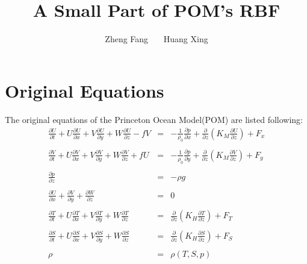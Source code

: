 \documentclass[oribibl]{llncs}
\begin{document}
\title{A Small Part of POM's RBF}
\author{Zheng Fang \ \ \ Huang Xing}
\maketitle

\section{Original Equations}

The original equations of the Princeton Ocean Model(POM) are listed following:
\begin{eqnarray}
\frac{\partial U}{\partial t}+U\frac{\partial U}{\partial x}+V\frac{\partial U}{\partial y}+W\frac{\partial U}{\partial z}-fV &=& - \frac{1}{\rho_0} \frac{\partial p}{\partial x} + \frac{\partial}{\partial z}  \left ( K_M \frac{\partial U}{\partial z} \right) +F_x\label{eqPOM1}\\ \nonumber \\ 
\frac{\partial V}{\partial t}+U\frac{\partial V}{\partial x}+V\frac{\partial V}{\partial y}+W\frac{\partial V}{\partial z}+fU &=& - \frac{1}{\rho_0} \frac{\partial p}{\partial y} + \frac{\partial}{\partial z}  \left ( K_M \frac{\partial V}{\partial z} \right) +F_y
\label{eqPOM2}\\ \nonumber \\ 
\frac{\partial p}{\partial z} &=& - \rho g \\ \nonumber \\ 
\frac{\partial U}{\partial x} + \frac{\partial V}{\partial y} + \frac{\partial W}{\partial z} &=& 0 \label{eqPOM4}\\ \nonumber \\ 
\frac{\partial T}{\partial t}+U\frac{\partial T}{\partial x}+V\frac{\partial T}{\partial y}+W\frac{\partial T}{\partial z} &=& \frac{\partial}{\partial z}  \left ( K_H \frac{\partial T}{\partial z} \right) +F_T \\ \nonumber \\ 
\frac{\partial S}{\partial t}+U\frac{\partial S}{\partial x}+V\frac{\partial S}{\partial y}+W\frac{\partial S}{\partial z} &=& \frac{\partial}{\partial z}  \left ( K_H \frac{\partial S}{\partial z} \right) +F_S\\ \nonumber \\ 
\rho &=& \rho(T,S,p)
\end{eqnarray}
\end{document}
